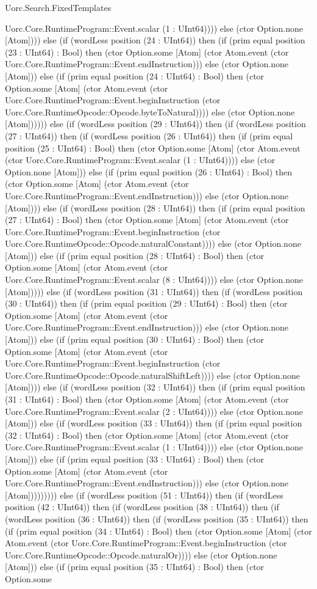 \begin{lexlean}{Uorc.Search.FixedTemplates}
\begin{semanticmodule}
{Uorc.Core.RuntimeProgram::Event.scalar (1 : UInt64)))) else (ctor Option.none [Atom]))) else (if (wordLess position (24 : UInt64)) then (if (prim equal position (23 : UInt64) : Bool) then (ctor Option.some [Atom] (ctor Atom.event (ctor Uorc.Core.RuntimeProgram::Event.endInstruction))) else (ctor Option.none [Atom])) else (if (prim equal position (24 : UInt64) : Bool) then (ctor Option.some [Atom] (ctor Atom.event (ctor Uorc.Core.RuntimeProgram::Event.beginInstruction (ctor Uorc.Core.RuntimeOpcode::Opcode.byteToNatural)))) else (ctor Option.none [Atom]))))) else (if (wordLess position (29 : UInt64)) then (if (wordLess position (27 : UInt64)) then (if (wordLess position (26 : UInt64)) then (if (prim equal position (25 : UInt64) : Bool) then (ctor Option.some [Atom] (ctor Atom.event (ctor Uorc.Core.RuntimeProgram::Event.scalar (1 : UInt64)))) else (ctor Option.none [Atom])) else (if (prim equal position (26 : UInt64) : Bool) then (ctor Option.some [Atom] (ctor Atom.event (ctor Uorc.Core.RuntimeProgram::Event.endInstruction))) else (ctor Option.none [Atom]))) else (if (wordLess position (28 : UInt64)) then (if (prim equal position (27 : UInt64) : Bool) then (ctor Option.some [Atom] (ctor Atom.event (ctor Uorc.Core.RuntimeProgram::Event.beginInstruction (ctor Uorc.Core.RuntimeOpcode::Opcode.naturalConstant)))) else (ctor Option.none [Atom])) else (if (prim equal position (28 : UInt64) : Bool) then (ctor Option.some [Atom] (ctor Atom.event (ctor Uorc.Core.RuntimeProgram::Event.scalar (8 : UInt64)))) else (ctor Option.none [Atom])))) else (if (wordLess position (31 : UInt64)) then (if (wordLess position (30 : UInt64)) then (if (prim equal position (29 : UInt64) : Bool) then (ctor Option.some [Atom] (ctor Atom.event (ctor Uorc.Core.RuntimeProgram::Event.endInstruction))) else (ctor Option.none [Atom])) else (if (prim equal position (30 : UInt64) : Bool) then (ctor Option.some [Atom] (ctor Atom.event (ctor Uorc.Core.RuntimeProgram::Event.beginInstruction (ctor Uorc.Core.RuntimeOpcode::Opcode.naturalShiftLeft)))) else (ctor Option.none [Atom]))) else (if (wordLess position (32 : UInt64)) then (if (prim equal position (31 : UInt64) : Bool) then (ctor Option.some [Atom] (ctor Atom.event (ctor Uorc.Core.RuntimeProgram::Event.scalar (2 : UInt64)))) else (ctor Option.none [Atom])) else (if (wordLess position (33 : UInt64)) then (if (prim equal position (32 : UInt64) : Bool) then (ctor Option.some [Atom] (ctor Atom.event (ctor Uorc.Core.RuntimeProgram::Event.scalar (1 : UInt64)))) else (ctor Option.none [Atom])) else (if (prim equal position (33 : UInt64) : Bool) then (ctor Option.some [Atom] (ctor Atom.event (ctor Uorc.Core.RuntimeProgram::Event.endInstruction))) else (ctor Option.none [Atom])))))))) else (if (wordLess position (51 : UInt64)) then (if (wordLess position (42 : UInt64)) then (if (wordLess position (38 : UInt64)) then (if (wordLess position (36 : UInt64)) then (if (wordLess position (35 : UInt64)) then (if (prim equal position (34 : UInt64) : Bool) then (ctor Option.some [Atom] (ctor Atom.event (ctor Uorc.Core.RuntimeProgram::Event.beginInstruction (ctor Uorc.Core.RuntimeOpcode::Opcode.naturalOr)))) else (ctor Option.none [Atom])) else (if (prim equal position (35 : UInt64) : Bool) then (ctor Option.some }
\end{semanticmodule}
\end{lexlean}
